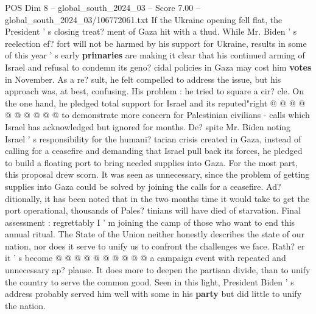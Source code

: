 \begin{textsample}{POS Dim 8 – global\_south\_2024\_03 – Score 7.00 – global\_south\_2024\_03/106772061.txt}
If the Ukraine opening fell flat, the President ' s closing treat? ment of Gaza hit with a thud.
While Mr.
Biden ' s reelection ef? fort will not be harmed by his support for Ukraine, results in some of this year ' s early \textbf{primaries} are making it clear that his continued arming of Israel and refusal to condemn its geno? cidal policies in Gaza may cost him \textbf{votes} in November.
As a re? sult, he felt compelled to address the issue, but his approach was, at best, confusing.
His problem : he tried to square a cir? cle.
On the one hand, he pledged total support for Israel and its reputed"right @ @ @ @ @ @ @ @ @ @ to demonstrate more concern for Palestinian civilians - calls which Israel has acknowledged but ignored for months.
De? spite Mr.
Biden noting Israel ' s responsibility for the humani? tarian crisis created in Gaza, instead of calling for a ceasefire and demanding that Israel pull back its forces, he pledged to build a floating port to bring needed supplies into Gaza.
For the most part, this proposal drew scorn.
It was seen as unnecessary, since the problem of getting supplies into Gaza could be solved by joining the calls for a ceasefire.
Ad? ditionally, it has been noted that in the two months time it would take to get the port operational, thousands of Pales? tinians will have died of starvation.
Final assessment : regrettably I ' m joining the camp of those who want to end this annual ritual.
The State of the Union neither honestly describes the state of our nation, nor does it serve to unify us to confront the challenges we face.
Rath? er it ' s become @ @ @ @ @ @ @ @ @ @ a campaign event with repeated and unnecessary ap? plause.
It does more to deepen the partisan divide, than to unify the country to serve the common good.
Seen in this light, President Biden ' s address probably served him well with some in his \textbf{party} but did little to unify the nation.

\end{textsample}
